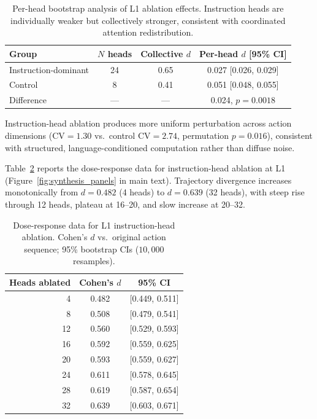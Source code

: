 \begin{table}[h]
\centering
\caption{Per-head bootstrap analysis of L1 ablation effects. Instruction heads are individually weaker but collectively stronger, consistent with coordinated attention redistribution.}
\label{tab:perhead_bootstrap}
\small
\begin{tabular}{lccc}
\toprule
\textbf{Group} & \textbf{$N$ heads} & \textbf{Collective $d$} & \textbf{Per-head $d$ [95\% CI]} \\
\midrule
Instruction-dominant & 24 & 0.65 & 0.027 [0.026, 0.029] \\
Control & 8 & 0.41 & 0.051 [0.048, 0.055] \\
\midrule
Difference & --- & --- & 0.024, $p = 0.0018$ \\
\bottomrule
\end{tabular}
\end{table}

Instruction-head ablation produces more uniform perturbation across action dimensions (CV${}=1.30$ vs.\ control CV${}=2.74$, permutation $p = 0.016$), consistent with structured, language-conditioned computation rather than diffuse noise.

Table~\ref{tab:dose_response} reports the dose-response data for instruction-head ablation at L1 (Figure~\ref{fig:synthesis_panels} in main text).
Trajectory divergence increases monotonically from $d = 0.482$ (4 heads) to $d = 0.639$ (32 heads), with steep rise through 12 heads, plateau at 16--20, and slow increase at 20--32.

\begin{table}[h]
\centering
\caption{Dose-response data for L1 instruction-head ablation. Cohen's $d$ vs.\ original action sequence; 95\% bootstrap CIs ($10{,}000$ resamples).}
\label{tab:dose_response}
\small
\begin{tabular}{rcc}
\toprule
\textbf{Heads ablated} & \textbf{Cohen's $d$} & \textbf{95\% CI} \\
\midrule
4 & 0.482 & [0.449, 0.511] \\
8 & 0.508 & [0.479, 0.541] \\
12 & 0.560 & [0.529, 0.593] \\
16 & 0.592 & [0.559, 0.625] \\
20 & 0.593 & [0.559, 0.627] \\
24 & 0.611 & [0.578, 0.645] \\
28 & 0.619 & [0.587, 0.654] \\
32 & 0.639 & [0.603, 0.671] \\
\bottomrule
\end{tabular}
\end{table}

